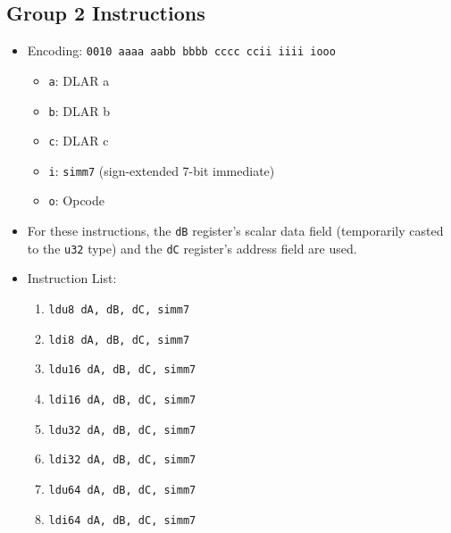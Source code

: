 \documentclass{article}
\begin{document}
	\subsection{Group 2 Instructions}
		\begin{itemize}
		\item Encoding: \texttt{0010 aaaa aabb bbbb  cccc ccii iiii iooo}
			\begin{itemize}
			\item \texttt{a}:  DLAR a
			\item \texttt{b}:  DLAR b
			\item \texttt{c}:  DLAR c
			\item \texttt{i}:  \texttt{simm7} (sign-extended 7-bit
			immediate)
			\item \texttt{o}:  Opcode
			\end{itemize}

		\item For these instructions, the \texttt{dB} register's scalar
		data field (temporarily casted to the \texttt{u32} type) and the
		\texttt{dC} register's address field are used. 

		\item Instruction List:
			\begin{enumerate}
			\item \texttt{ldu8 dA, dB, dC, simm7}
			\item \texttt{ldi8 dA, dB, dC, simm7}
			\item \texttt{ldu16 dA, dB, dC, simm7}
			\item \texttt{ldi16 dA, dB, dC, simm7}
			\item \texttt{ldu32 dA, dB, dC, simm7}
			\item \texttt{ldi32 dA, dB, dC, simm7}
			\item \texttt{ldu64 dA, dB, dC, simm7}
			\item \texttt{ldi64 dA, dB, dC, simm7}
			\end{enumerate}
		\end{itemize}
		\newpage
\end{document}
